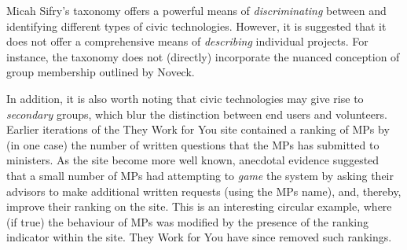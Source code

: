 Micah Sifry’s taxonomy offers a powerful means of \emph{discriminating} between and identifying different types of civic technologies.
However, it is suggested that it does not offer a comprehensive means of \emph{describing} individual projects.
For instance, the taxonomy does not (directly) incorporate the nuanced conception of group membership outlined by Noveck.

In addition, it is also worth noting that civic technologies may give rise to \emph{secondary} groups, which blur the distinction between end users and volunteers.
Earlier iterations of the They Work for You site contained a ranking of MPs by (in one case) the number of written questions that the MPs has submitted to ministers.
As the site become more well known, anecdotal evidence suggested that a small number of MPs had attempting to \emph{game} the system by asking their advisors to make additional written requests (using the MPs name), and, thereby, improve their ranking on the site.
This is an interesting circular example, where (if true) the behaviour of MPs was modified by the presence of the ranking indicator within the site.
They Work for You have since removed such rankings.